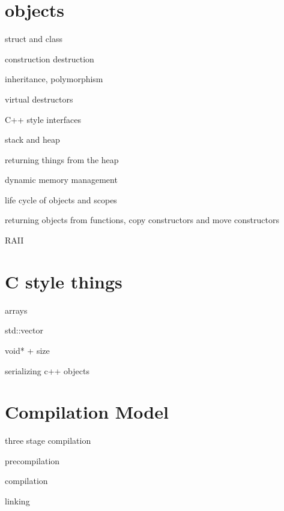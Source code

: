 \documentclass[aspectratio=169]{beamer}
\begin{document}
\section{objects}

\begin{frame}
  struct and class

  construction destruction
\end{frame}

\begin{frame}
  inheritance, polymorphism

  virtual destructors
\end{frame}

\begin{frame}
  C++ style interfaces

\end{frame}

\begin{frame}
  stack and heap
\end{frame}

\begin{frame}
  returning things from the heap

  dynamic memory management
\end{frame}

\begin{frame}
  life cycle of objects and scopes

  returning objects from functions, copy constructors and move constructors
\end{frame}

\begin{frame}
  RAII  
\end{frame}

\section{C style things}

\begin{frame}
  arrays

  std::vector

  void* + size

  serializing c++ objects
\end{frame}

\section{Compilation Model}

\begin{frame}
  three stage compilation

  precompilation

  compilation

  linking  
\end{frame}
\end{document}
